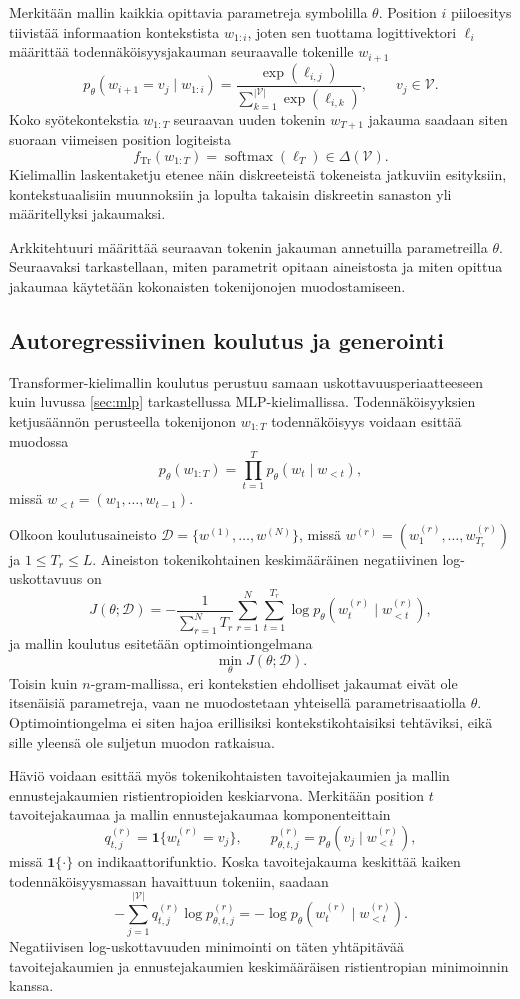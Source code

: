 Merkitään mallin kaikkia opittavia parametreja symbolilla \(\theta\).
Position \(i\) piiloesitys tiivistää informaation kontekstista \(w_{1:i}\),
joten sen tuottama logittivektori \(\ell_i\) määrittää todennäköisyysjakauman
seuraavalle tokenille \(w_{i+1}\)
$$
p_{\theta}(w_{i+1}=v_j \mid w_{1:i})
=
\frac{\exp(\ell_{i,j})}
{\sum_{k=1}^{|\mathcal{V}|}\exp(\ell_{i,k})},
\qquad
v_j \in \mathcal{V}.
$$
Koko syötekontekstia \(w_{1:T}\) seuraavan uuden tokenin \(w_{T+1}\) jakauma
saadaan siten suoraan viimeisen position logiteista
$$
f_{\mathrm{Tr}}(w_{1:T})
=
\operatorname{softmax}(\ell_T)
\in
\Delta(\mathcal{V}).
$$
Kielimallin laskentaketju etenee näin diskreeteistä tokeneista
jatkuviin esityksiin, kontekstuaalisiin muunnoksiin ja lopulta
takaisin diskreetin sanaston yli määritellyksi jakaumaksi.

Arkkitehtuuri määrittää seuraavan tokenin jakauman annetuilla
parametreilla \(\theta\). Seuraavaksi tarkastellaan, miten
parametrit opitaan aineistosta ja miten opittua jakaumaa
käytetään kokonaisten tokenijonojen muodostamiseen.

\subsection{Autoregressiivinen koulutus ja generointi}

Transformer-kielimallin koulutus perustuu samaan
uskottavuusperiaatteeseen kuin luvussa \ref{sec:mlp} tarkastellussa MLP-kielimallissa. Todennäköisyyksien ketjusäännön perusteella tokenijonon
\(w_{1:T}\) todennäköisyys voidaan esittää muodossa
$$
p_{\theta}(w_{1:T})
=
\prod_{t=1}^{T}
p_{\theta}(w_t \mid w_{<t}),
$$
missä \(w_{<t}=(w_1,\dots,w_{t-1})\).

Olkoon koulutusaineisto
\(\mathcal{D}=\{w^{(1)},\dots,w^{(N)}\}\), missä
\(w^{(r)}=(w_1^{(r)},\dots,w_{T_r}^{(r)})\) ja
\(1 \le T_r \le L\). Aineiston tokenikohtainen
keskimääräinen negatiivinen log-uskottavuus on
$$
J(\theta;\mathcal{D})
=
-\frac{1}{\sum_{r=1}^{N}T_r}
\sum_{r=1}^{N}
\sum_{t=1}^{T_r}
\log p_{\theta}
\left(
  w_t^{(r)}
  \mid
  w_{<t}^{(r)}
\right),
$$
ja mallin koulutus esitetään optimointiongelmana
$$
\min_{\theta} J(\theta;\mathcal{D}).
$$
Toisin kuin \(n\)-gram-mallissa, eri kontekstien
ehdolliset jakaumat eivät ole itsenäisiä parametreja,
vaan ne muodostetaan yhteisellä parametrisaatiolla
\(\theta\). Optimointiongelma ei siten hajoa erillisiksi
kontekstikohtaisiksi tehtäviksi, eikä sille yleensä ole
suljetun muodon ratkaisua.

Häviö voidaan esittää myös tokenikohtaisten tavoitejakaumien ja mallin ennustejakaumien ristientropioiden keskiarvona.
Merkitään position \(t\) tavoitejakaumaa ja mallin
ennustejakaumaa komponenteittain
$$
q_{t,j}^{(r)}
=
\mathbf{1}\{w_t^{(r)}=v_j\},
\qquad
p_{\theta,t,j}^{(r)}
=
p_{\theta}
\left(
  v_j \mid w_{<t}^{(r)}
\right),
$$
missä \(\mathbf{1}\{\cdot\}\) on indikaattorifunktio.
Koska tavoitejakauma keskittää kaiken todennäköisyysmassan
havaittuun tokeniin, saadaan
$$
-\sum_{j=1}^{|\mathcal{V}|}
q_{t,j}^{(r)}\log p_{\theta,t,j}^{(r)}
=
-\log p_{\theta}
\left(
  w_t^{(r)} \mid w_{<t}^{(r)}
\right).
$$
Negatiivisen log-uskottavuuden minimointi on täten
yhtäpitävää tavoitejakaumien ja ennustejakaumien
keskimääräisen ristientropian minimoinnin kanssa.

